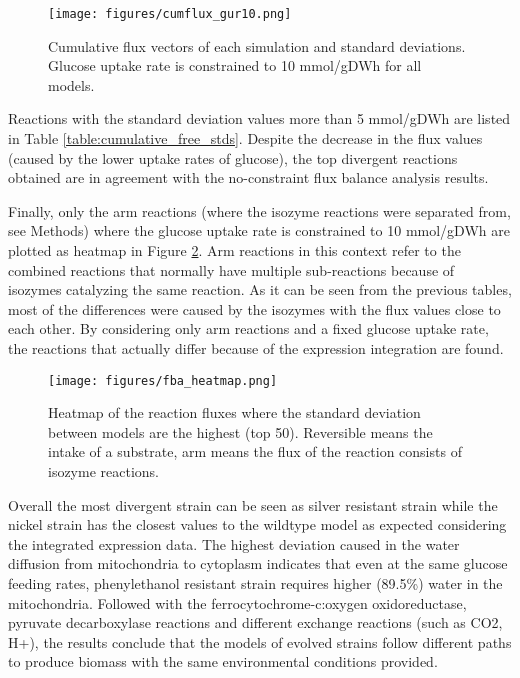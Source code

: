 \begin{figure}[H]
  \begin{center}
  \texttt{[image: figures/cumflux\_gur10.png]}
  \caption[Cumulative flux vectors of each experiment when glucose uptake rate is constrained]{Cumulative flux vectors of each simulation and standard deviations. Glucose uptake rate is constrained to 10 mmol/gDWh for all models. }
  \label{fig:cumflux_gur10}
  \end{center}
\end{figure}

Reactions with the standard deviation values more than 5 mmol/gDWh are listed in Table \ref{table:cumulative_free_stds}. Despite the decrease in the flux values (caused by the lower uptake rates of glucose), the top divergent reactions obtained are in agreement with the no-constraint flux balance analysis results.



Finally, only the arm reactions (where the isozyme reactions were separated from, see Methods) where the glucose uptake rate is constrained to 10 mmol/gDWh are plotted as heatmap in Figure \ref{fig:fba_heatmap}. Arm reactions in this context refer to the combined reactions that normally have multiple sub-reactions because of isozymes catalyzing the same reaction. As it can be seen from the previous tables, most of the differences were caused by the isozymes with the flux values close to each other. By considering only arm reactions and a fixed glucose uptake rate, the reactions that actually differ because of the expression integration are found.

\begin{figure}[H]
  \begin{center}
  \texttt{[image: figures/fba\_heatmap.png]}
  \caption[Heatmap of the reaction fluxes where the standard deviation between models are the highest (top 50). Reversible means the intake of a substrate, arm means the flux of the reaction consists of isozyme reactions]{Heatmap of the reaction fluxes where the standard deviation between models are the highest (top 50). Reversible means the intake of a substrate, arm means the flux of the reaction consists of isozyme reactions.}
  \label{fig:fba_heatmap}
  \end{center}
\end{figure}

Overall the most divergent strain can be seen as silver resistant strain while the nickel strain has the closest values to the wildtype model as expected considering the integrated expression data. The highest deviation caused in the water diffusion from mitochondria to cytoplasm indicates that even at the same glucose feeding rates, phenylethanol resistant strain requires higher (89.5\%) water in the mitochondria. Followed with the ferrocytochrome-c:oxygen oxidoreductase, pyruvate decarboxylase reactions and different exchange reactions (such as CO2, H+), the results conclude that the models of evolved strains follow different paths to produce biomass with the same environmental conditions provided.


